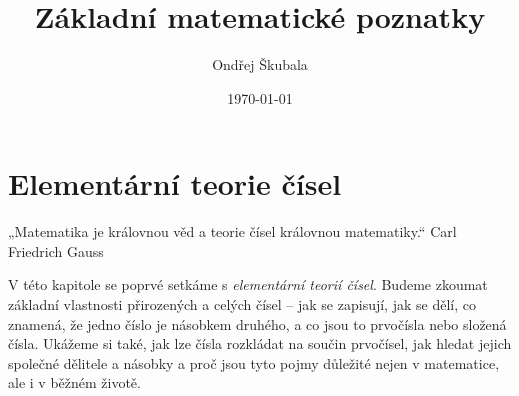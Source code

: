 \documentclass[12pt,a4paper]{article}
\title{Základní matematické poznatky}
\author{Ondřej Škubala}
\date{\today}
\begin{document}
\maketitle
\newpage

\section{Elementární teorie čísel}

\begin{quotebox}
{„Matematika je královnou věd a teorie čísel královnou matematiky.“}
{Carl Friedrich Gauss}
\end{quotebox}

\noindent
V této kapitole se poprvé setkáme s \emph{elementární teorií čísel}.  
Budeme zkoumat základní vlastnosti přirozených a celých čísel – jak se zapisují, jak se dělí, co znamená, že jedno číslo je násobkem druhého, a co jsou to prvočísla nebo složená čísla.  
Ukážeme si také, jak lze čísla rozkládat na součin prvočísel, jak hledat jejich společné dělitele a násobky a proč jsou tyto pojmy důležité nejen v matematice, ale i v běžném životě.  
\end{document}
